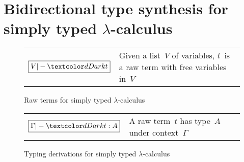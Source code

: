 
\section{Bidirectional type synthesis for simply typed \texorpdfstring{$\lambda$}{λ}-calculus} \label{sec:key-ideas}

\begin{figure}
  \small
  \bgroup
  \renewcommand{\arraystretch}{1.5}
  \begin{tabular}{ r l }
    $\boxed{V |- \isTerm{t}}$ & Given a list~$V$ of variables, $t$~is a raw term with free variables in~$V$
  \end{tabular}
  \egroup
  \centering
  \caption{Raw terms for simply typed $\lambda$-calculus}
  \label{fig:STLC-raw-terms}
\end{figure}

\begin{figure}
  \small
  \bgroup
  \renewcommand{\arraystretch}{1.5}
  \begin{tabular}{ r l }
    $\boxed{\Gamma |- \isTerm{t} : A}$ & A raw term~$t$ has type~$A$ under context~$\Gamma$
  \end{tabular}
  \egroup
  \centering
  \caption{Typing derivations for simply typed $\lambda$-calculus}
  \label{fig:STLC-typing-derivations}
\end{figure}

